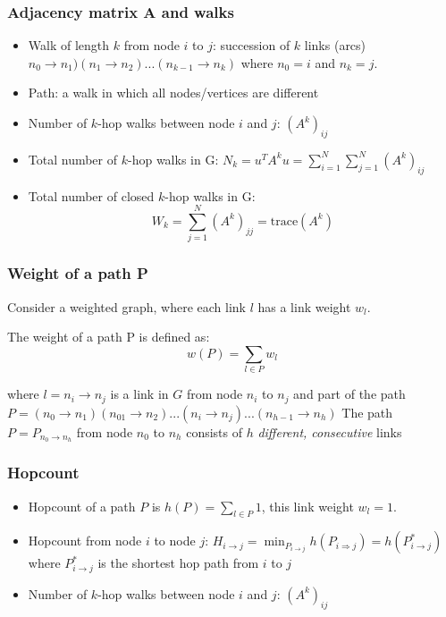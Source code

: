 \subsubsection{Adjacency matrix A and walks}
\begin{itemize}
  \item Walk of length $k$ from node $i$ to $j$: succession of $k$ links (arcs)
  $n_0 \rightarrow n_1)(n_1 \rightarrow n_2) ... (n_{k-1} \rightarrow n_k)$ where $n_0 = i$ and
  $n_k = j$.
  \item Path: a walk in which all nodes/vertices are different
  \item Number of $k$-hop walks between node $i$ and $j$: $(A^k)_{ij}$
  \item Total number of $k$-hop walks in G: $N_k = u^T A^k u = \sum_{i=1}^N \sum_{j=1}^N (A^k)_{ij}$
  \item Total number of closed $k$-hop walks in G:
  $$
  W_k = \sum_{j=1}^N (A^k)_{jj} = \text{trace}(A^k)
  $$
\end{itemize}

\subsubsection{Weight of a path P}
Consider a weighted graph, where each link $l$ has a link weight $w_l$.

The weight of a path P is defined as:
$$
w(P) = \sum_{l \in P} w_l
$$

where $l = n_i \rightarrow n_j$ is a link in $G$ from node $n_i$ to $n_j$ and part of the path
$P = (n_0 \rightarrow n_1)(n_01 \rightarrow n_2)...(n_i \rightarrow n_j)...(n_{h-1} \rightarrow n_h)$
The path $P = P_{n_0 \rightarrow n_h}$ from node $n_0$ to $n_h$ consists of $h$ \emph{different, 
consecutive} links

\subsubsection{Hopcount}
\begin{itemize}
  \item Hopcount of a path $P$ is $h(P) = \sum_{l \in P} 1$, this link weight $w_l = 1$. 
  \item Hopcount from node $i$ to node $j$: 
  $H_{i \rightarrow j} = \min_{P_{i \rightarrow j}} h(P_{i \Rightarrow j}) 
  = h(P_{i \rightarrow j}^{*})$ where $P_{i \rightarrow j}^*$ is the shortest hop path from
  $i$ to $j$
  \item Number of $k$-hop walks between node $i$ and $j$: $(A^k)_{ij}$
\end{itemize}

